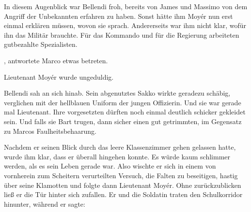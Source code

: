 \par

In diesem Augenblick war Bellendi froh, bereits von James und Massimo von dem Angriff der Unbekannten erfahren zu haben. Sonst hätte ihm Moyér nun erst einmal erklären müssen, wovon sie sprach. Andererseits war ihm nicht klar, wofür ihn das Militär brauchte. Für das Kommando und für die Regierung arbeiteten gutbezahlte Spezialisten.

\par

, antwortete Marco etwas betreten. 

\par

Lieutenant Moyér wurde ungeduldig. 

\par

Bellendi sah an sich hinab. Sein abgenutztes Sakko wirkte geradezu schäbig, verglichen mit der hellblauen Uniform der jungen Offizierin. Und sie war gerade mal Lieutenant. Ihre vorgesetzten dürften noch einmal deutlich schicker gekleidet sein. Und falls sie Bart trugen, dann sicher einen gut getrimmten, im Gegensatz zu Marcos Faulheitsbehaarung.

\par

Nachdem er seinen Blick durch das leere Klassenzimmer gehen gelassen hatte, wurde ihm klar, dass er überall hingehen konnte. Es würde kaum schlimmer werden, als es sein Leben gerade war. Also wischte er sich in einem von vornherein zum Scheitern verurteilten Versuch, die Falten zu beseitigen, hastig über seine Klamotten und folgte dann Lieutenant Moyér. Ohne zurückzublicken ließ er die Tür hinter sich zufallen. Er und die Soldatin traten den Schulkorridor hinunter, während er sagte: 
